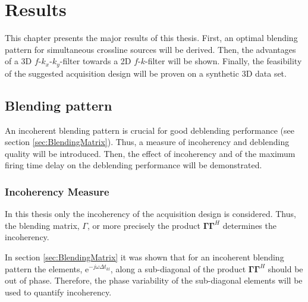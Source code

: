 \chapter{Results}

This chapter presents the major results of this thesis. First, an optimal blending pattern for simultaneous crossline sources will be derived. Then, the advantages of a 3D $f$-$k_x$-$k_y$-filter towards a 2D $f$-$k$-filter will be shown. Finally, the feasibility of the suggested acquisition design will be proven on a synthetic 3D data set. 
 
\section{Blending pattern}

An incoherent blending pattern is crucial for good deblending performance (see section \ref{sec:BlendingMatrix}). Thus, a measure of incoherency and deblending quality will be introduced. Then, the effect of incoherency and of the maximum firing time delay on the deblending performance will be demonstrated.

\subsection*{Incoherency Measure}

In this thesis only the incoherency of the acquisition design is considered. Thus, the blending matrix, $\Gamma$, or more precisely the product $\mathbf{\Gamma \Gamma}^H$ determines the incoherency.

In section \ref{sec:BlendingMatrix} it was shown that for an incoherent blending pattern the elements, $\mathrm{e}^{-j \omega \Delta t_{kl}}$, along a sub-diagonal of the product $\mathbf{\Gamma \Gamma}^H$ should be out of phase. Therefore, the phase variability of the sub-diagonal elements will be used to quantify incoherency.

